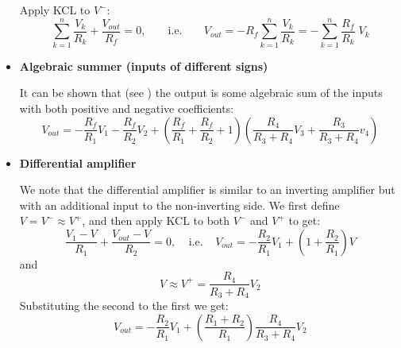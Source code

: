 \documentclass{article}
\begin{document}
\begin{itemize}
  Apply KCL to $V^-$:
  \begin{equation} \sum_{k=1}^n \frac{V_k}{R_k}+\frac{V_{out}}{R_f}=0,\;\;\;\;\;\;\;
  \mbox{i.e.}\;\;\;\;\;\;\;V_{out}=-R_f \sum_{k=1}^n \frac{V_k}{R_k}
  =- \sum_{k=1}^n \frac{R_f}{R_k} \;V_k  \end{equation}

\item {\bf Algebraic summer (inputs of different signs)}

  
  \begin{comment}
  Define $V\stackrel{\triangle}{=}V^+ \approx V^- $. Apply KCL to $V^-$ and
  $V^+$ we get:
  \begin{equation}
  \frac{V_1-V}{R_1}+\frac{V_2-V}{R_2}+\frac{V_{out}-V}{R_f}=0,\;\;\;\;\;\;
  \mbox{and}\;\;\;\;\;\;\;\;
  \frac{V_3-V}{R_3}+\frac{V_4-V}{R_4}=0 
  \end{equation}
  Solving the 2nd equation for $V$ we get:
  \begin{equation}
  V=\frac{R_4}{R_3+R_4} V_3 + \frac{R_3}{R_3+R_4} V_4	
  \end{equation}
  and substitute it into the first equation to get
  \begin{equation}
  V_{out}=-\frac{R_f}{R_1}V_1-\frac{R_f}{R_2}V_2
  +\left(\frac{R_f}{R_1}+\frac{R_f}{R_2}+1\right)
  \left(\frac{R_4}{R_3+R_4} V_3+\frac{R_3}{R_3+R_4} v_4\right) 
  \end{equation}
  \end{comment}

  It can be shown that (see )
  the output is some algebraic sum of the inputs with both positive and
  negative coefficients:
  \begin{equation}
  V_{out}=-\frac{R_f}{R_1}V_1-\frac{R_f}{R_2}V_2
  +\left(\frac{R_f}{R_1}+\frac{R_f}{R_2}+1\right)
  \left(\frac{R_4}{R_3+R_4} V_3+\frac{R_3}{R_3+R_4} v_4\right) 
  \end{equation}


\item {\bf Differential amplifier}


  We note that the differential amplifier is similar to an inverting
  amplifier but with an additional input to the non-inverting side.
  We first define $V=V^-\approx V^+$, and then apply KCL to both $V^-$ 
  and $V^+$ to get:
  \begin{equation} 
  \frac{V_1-V}{R_1}+\frac{V_{out}-V}{R_2}=0,\;\;\;\;\mbox{i.e.}\;\;\;\;
  V_{out}=-\frac{R_2}{R_1}V_1+\left(1+\frac{R_2}{R_1}\right) V 
  \end{equation}
  and
  \begin{equation} 
  V\approx V^+=\frac{R_4}{R_3+R_4}V_2 
  \end{equation}
  Substituting the second to the first we get:
  \begin{equation}
  V_{out}=-\frac{R_2}{R_1}V_1+\left(\frac{R_1+R_2}{R_1}\right)\frac{R_4}{R_3+R_4}V_2 
  \end{equation}


\end{itemize}
\end{document}
